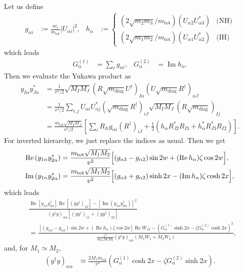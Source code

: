\documentclass[a4paper,11pt,captions=tableheading,DIV=12]{scrartcl}
\numberwithin{equation}{section}
\newcommand\w[1]{_{\mathrm{#1}}}
\newcommand\Abs[1]{\left\lvert#1\right\rvert}
\renewcommand{\Re}{\mathop{\mathrm{Re}}}
\renewcommand{\Im}{\mathop{\mathrm{Im}}}
\newcommand\mtot{m_{\mathrm{tot}}}
\newcommand\yydag{(yy^\dagger)}
\begin{document}
Let us define
\begin{align}
 g_{\alpha i} &:= \frac{m_i}{\mtot}\Abs{U_{\alpha i}}^2,
&
 h_{\alpha} &:= 
\begin{cases}
\left({2\sqrt{m_2m_3}}/{\mtot}\right)\left(U_{\alpha2}U^*_{\alpha3}\right) & \text{(NH)}\\
\left({2\sqrt{m_1m_2}}/{\mtot}\right)\left(U_{\alpha1}U^*_{\alpha2}\right) & \text{(IH)}
\end{cases}
\end{align}
which leads
\begin{align}
 G^{(1)}_\alpha &= \sum_i g_{\alpha i},
&
 G_\alpha^{(2)} &= \Im h_\alpha.
\end{align}
Then we evaluate the Yukawa product as
\begin{align}
 y_{I\alpha} y^*_{J\alpha}
&=
\frac{1}{v^2/2}
\sqrt{M_I M_J}(R\sqrt{m\w{diag}}U^\dagger)_{I\alpha}(U\sqrt{m\w{diag}}R^\dagger)_{\alpha J}
\\&=
\frac{1}{v^2/2}\sum_{i,j}
U_{\alpha i}U^*_{\alpha j}
(\sqrt{m\w{diag}}R^\dagger)_{i J}
\sqrt{M_I M_J}
(R\sqrt{m\w{diag}})_{Ij}
\\&=
\frac{\mtot\sqrt{M_I M_J}}{v^2/2}
\left[
   \sum_{i}R_{Ii}g_{\alpha i}(R^\dagger)_{iJ}
   +\frac12\left(
      h_\alpha   R^*_{J2} R_{I3}+
      h_\alpha^* R^*_{J3} R_{I2}
   \right)
\right].
\end{align}
For inverted hierarchy, we just replace the indices as usual.
Then we get
\begin{align}
 \Re\left(y_{1\alpha} y^*_{2\alpha}\right)
&=
\frac{\mtot\sqrt{M_1 M_2}}{v^2}
\Bigl[
(g_{\alpha 3}-g_{\alpha2})\sin2w
+(\Re h_\alpha)\zeta\cos2w\Bigr],\\
 \Im\left(y_{1\alpha} y^*_{2\alpha}\right)
&=
\frac{\mtot\sqrt{M_1 M_2}}{v^2}
\Bigl[
(g_{\alpha 3}+g_{\alpha2})\sinh2x
 - (\Im h_\alpha)\zeta\cosh2x
\Bigr],
\end{align}
which leads
\begin{align}
& \frac{\Re[y_{1\alpha} y_{2\alpha}^*]\Re[(yy^\dagger)_{12}] - [\Im(y_{1\alpha}y_{2\alpha}^*)]^2
}{(y^\dagger y)_{\alpha\alpha}\left[\yydag_{11} + \yydag_{22}\right]}
\\&=
 \frac{\left[
(g_{\alpha 3}-g_{\alpha2})\sin2w
+(\Re h_\alpha)\zeta\cos2w\right]
\Re W_{12} - \left(G_\alpha^{(1)}\sinh2x-\zeta G^{(2)}_\alpha\cosh2x\right)^2
}{\frac{v^2}{\mtot M_1 M_2}(y^\dagger y)_{\alpha\alpha} (M_1W_1+M_2W_2)},
\end{align}
and, for $M_1\simeq M_2$,
\begin{align}
 (y^\dagger y)_{\alpha\alpha}
&\simeq
\frac{2M_1\mtot}{v^2}\left(
  G^{(1)}_\alpha\cosh2x - \zeta G^{(2)}_\alpha\sinh2x
\right).
\end{align}
\end{document}
